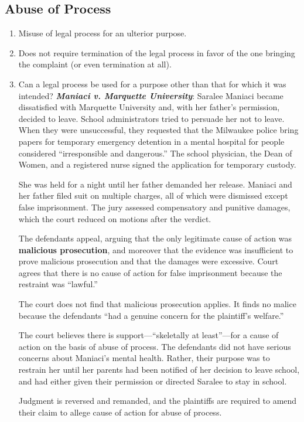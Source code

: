 \subsection{Abuse of Process}
\begin{enumerate}
    \item Misuse of legal process for an ulterior purpose.
    \item Does not require termination of the legal process in favor of the 
    one bringing the complaint (or even termination at all).
    \item Can a legal process be used for a purpose other than that for which 
    it was intended? \textbf{\emph{Maniaci v. Marquette University}}: Saralee 
    Maniaci became dissatisfied with Marquette University and, with her 
    father's permission, decided to leave. School administrators tried to 
    persuade her not to leave. When they were unsuccessful, they requested 
    that the Milwaukee police bring papers for temporary emergency detention 
    in a mental hospital for people considered ``irresponsible and 
    dangerous.'' The school physician, the Dean of Women, and a registered 
    nurse signed the application for temporary custody.

She was held for a night until her father demanded her release. Maniaci and 
her father filed suit on multiple charges, all of which were dismissed except 
false imprisonment. The jury assessed compensatory and punitive damages, which 
the court reduced on motions after the verdict.

The defendants appeal, arguing that the only legitimate cause of action was 
\textbf{malicious prosecution}, and moreover that the evidence was 
insufficient to prove malicious prosecution and that the damages were 
excessive. Court agrees that there is no cause of action for false 
imprisonment because the restraint was ``lawful.''

The court does not find that malicious prosecution applies. It finds no malice 
because the defendants ``had a genuine concern for the plaintiff's welfare.''

The court believes there is support---``skeletally at least''---for a cause of 
action on the basis of abuse of process. The defendants did not have serious 
concerns about Maniaci's mental health. Rather, their purpose was to restrain 
her until her parents had been notified of her decision to leave school, and 
had either given their permission or directed Saralee to stay in school.

Judgment is reversed and remanded, and the plaintiffs are required to amend 
their claim to allege cause of action for abuse of process.


\end{enumerate}

